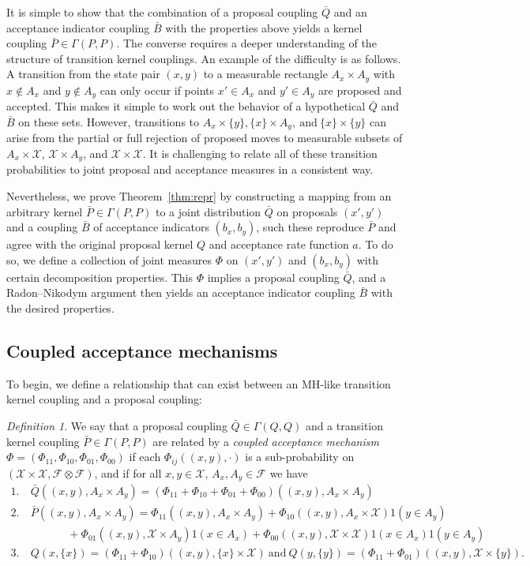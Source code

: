 \documentclass[aihp]{imsart}
\theoremstyle{plain}
\theoremstyle{remark}
\newtheorem{definition}[theorem]{Definition}
\theoremstyle{definition} \newtheorem{example}{Example}
\newcommand{\eq}[1]{\begin{align*}#1\end{align*}} %
\newcommand{\scrF}{\mathscr{F}}
\newcommand{\calX}{\mathcal{X}}
\newcommand{\sas}{\ \text{and} \ }
\newcommand{\calXp}{\calX \times \calX}
\newcommand{\scrFp}{\scrF \otimes \scrF}
\newcommand{\bp}{\bar P}
\newcommand{\bq}{\bar Q}
\newcommand{\bb}{\bar B}
\newcommand{\sx}{\{ x \}}
\newcommand{\sy}{\{ y \}}
\newcommand{\xy}{(x,y)}
\newcommand{\xyp}{(x',y')}
\newcommand{\bxy}{(b_x,b_y)}
\newcommand{\axy}{A_x \times A_y}
\begin{document}
It is simple to show that the combination of a proposal coupling $\bq$ and an acceptance indicator
coupling $\bb$ with the properties above yields a kernel coupling $\bp \in \Gamma(P,P)$. The
converse requires a deeper understanding of the structure of transition kernel couplings. An example
of the difficulty is as follows. A transition from the state pair $\xy$ to a measurable rectangle $A_x
\times A_y$ with $x \not \in A_x$ and $y \not \in A_y$ can only occur if points $x' \in A_x$ and $y'
\in A_y$ are proposed and accepted. This makes it simple to work out the behavior of a hypothetical
$\bq$ and $\bb$ on these sets. However, transitions to ${A_x \times \sy}, {\sx \times A_y}, \sas \sx
\times \sy$ can arise from the partial or full rejection of proposed moves to measurable subsets of
$A_x \times \calX$, $\calX \times A_y$, and $\calX \times \calX$. It is challenging to relate all of
these transition probabilities to joint proposal and acceptance measures in a consistent way.

Nevertheless, we prove Theorem~\ref{thm:repr} by constructing a mapping from an arbitrary kernel
$\bp \in \Gamma(P,P)$ to a joint distribution $\bq$ on proposals $(x', y')$ and a coupling $\bb$ of
acceptance indicators $\bxy$, such these reproduce $\bp$ and agree with the original proposal kernel
$Q$ and acceptance rate function $a$. To do so, we define a collection of joint measures $\Phi$ on
$\xyp$ and $\bxy$ with certain decomposition properties. This $\Phi$ implies a proposal coupling
$\bq$, and a Radon--Nikodym argument then yields an acceptance indicator coupling $\bb$ with the desired
properties.

\subsection{Coupled acceptance mechanisms}

To begin, we define a relationship that can exist between an MH-like transition kernel coupling and
a proposal coupling:

\smallskip

\begin{definition}
\label{def:cam}
We say that a proposal coupling $\bq \in \Gamma(Q,Q)$ and a transition kernel coupling $\bp \in \Gamma(P,P)$ are
related by a \textit{coupled acceptance mechanism} $\Phi = (\Phi_{11}, \Phi_{10},\Phi_{01}, \Phi_{00})$
if each $\Phi_{ij}(\xy, \cdot)$ is a sub-probability on $(\calXp, \scrFp)$,
and if for all $x,y \in \calX$, $A_x, A_y \in \scrF$ we have
\eq{
	1. \ &\bq(\xy, \axy) =
	(\Phi_{11}+\Phi_{10}+\Phi_{01}+\Phi_{00}) ( \xy, \axy ) \hspace{114pt} \\
	2. \ & \bp(\xy, \axy) = \Phi_{11}(\xy, \axy) + \Phi_{10}(\xy, A_x \times \calX) 1(y \in A_y)  \\
	& \hspace{40pt} + \Phi_{01}(\xy, \calX \times A_y) 1(x \in A_x)
	+ \Phi_{00}(\xy, \calX \times \calX) 1(x \in A_x) 1(y \in A_y) \\
	3. \ & Q(x,\sx)\! =\! (\Phi_{11}\!+\!\Phi_{10})(\xy, \sx\! \times\! \calX) \sas Q(y, \sy)\! = \! (\Phi_{11}\!+\!\Phi_{01})(\xy, \calX\! \times\! \sy).
}
\end{definition}
\end{document}
